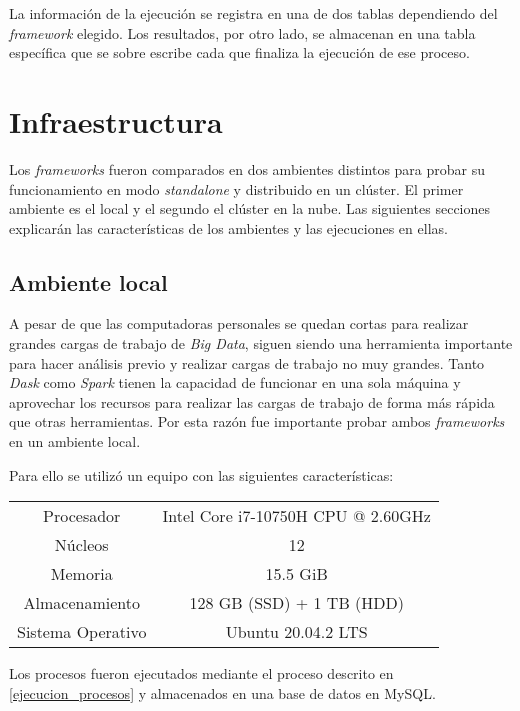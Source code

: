 La información de la ejecución se registra en una de dos tablas dependiendo del \textit{framework} elegido. Los resultados, por otro lado, se almacenan en una tabla específica que se sobre escribe cada que finaliza la ejecución de ese proceso. 

\section{Infraestructura}

Los \textit{frameworks} fueron comparados en dos ambientes distintos para probar su funcionamiento en modo \textit{standalone} y distribuido en un clúster. El primer ambiente es el local y el segundo el clúster en la nube. Las siguientes secciones explicarán las características de los ambientes y las ejecuciones en ellas.

\subsection{Ambiente local}

A pesar de que las computadoras personales se quedan cortas para realizar grandes cargas de trabajo de \textit{Big Data}, siguen siendo una herramienta importante para hacer análisis previo y realizar cargas de trabajo no muy grandes. Tanto \textit{Dask} como \textit{Spark} tienen la capacidad de funcionar en una sola máquina y aprovechar los recursos para realizar las cargas de trabajo de forma más rápida que otras herramientas. Por esta razón fue importante probar ambos \textit{frameworks} en un ambiente local. 

Para ello se utilizó un equipo con las siguientes características:

\begin{center}
\begin{tabular}{|c|c|}
 \hline
  Procesador & Intel Core i7-10750H CPU @ 2.60GHz \\ 
  Núcleos & 12 \\
  Memoria & 15.5 GiB \\ 
  Almacenamiento & 128 GB (SSD) + 1 TB (HDD) \\ 
  Sistema Operativo & Ubuntu 20.04.2 LTS \\
  \hline
\end{tabular}
\end{center}

Los procesos fueron ejecutados mediante el proceso descrito en \ref{ejecucion_procesos} y almacenados en una base de datos en MySQL.

